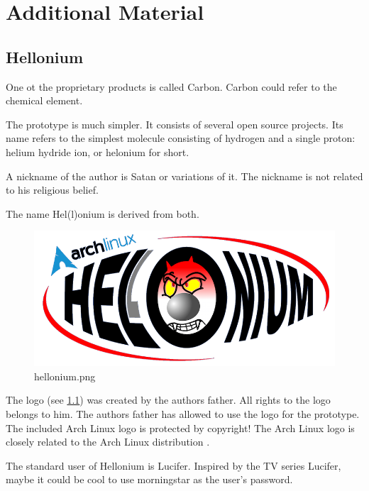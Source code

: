 \chapter{Additional Material}

\section{Hellonium}
\label{app:hellonium}

One ot the proprietary products is called Carbon. Carbon could refer to the chemical element.
\newline

\noindent The prototype is much simpler. It consists of several open source projects. Its name refers to the simplest molecule consisting of hydrogen and a single proton: helium hydride ion, or helonium for short.
\newline

\noindent A nickname of the author is Satan or variations of it. The nickname is not related to his religious belief.
\newline

\noindent The name Hel(l)onium is derived from both.
\newline

\begin{figure}[htbp]  %
  \centering
  \includegraphics[width=.5\textwidth]{figures/hellonium.png}
  \caption[Logo of Hel(l)onium]{hellonium.png}
  \label{fig:hellonium.png}
\end{figure}

\noindent The logo (see \cref{fig:hellonium.png}) was created by the authors father. All rights to the logo belongs to him. The authors father has allowed to use the logo for the prototype. The included Arch Linux logo is protected by copyright! The Arch Linux logo is closely related to the Arch Linux distribution \cite{ArchLinux}.
\newline

\noindent The standard user of Hellonium is Lucifer. Inspired by the TV series Lucifer, maybe it could be cool to use morningstar as the user's password.